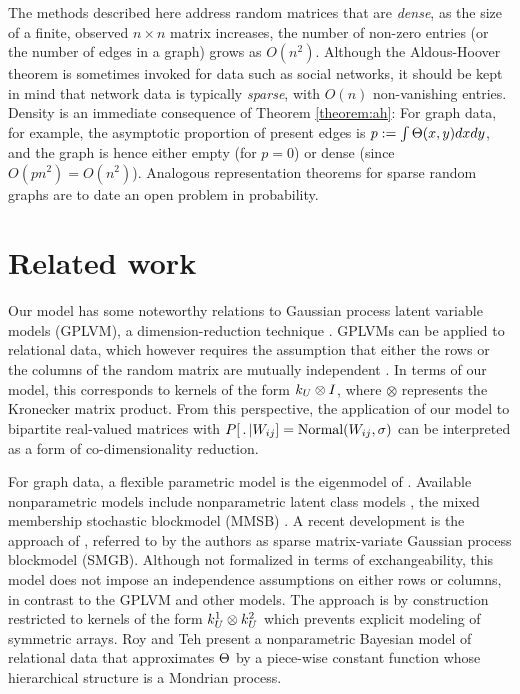 \begin{rem}
  The methods described here address random matrices that are \emph{dense}, \ie as the size of a finite, observed $n\times n$ matrix increases,
  the number of non-zero entries (or the number of edges in a graph) grows as $O(n^2)$. Although the Aldous-Hoover theorem is sometimes invoked
  for data such as social networks, it should be kept in mind that network data is typically \emph{sparse}, with $O(n)$ non-vanishing entries.
  Density is an immediate consequence of Theorem \ref{theorem:ah}: For graph data, for example, the asymptotic proportion of present edges is
  ${p:=\int\Theta(x,y)dxdy}$, and the graph is hence either empty (for $p=0$) or dense (since
  $O(pn^2)=O(n^2)$). Analogous representation theorems for sparse random graphs are to date an open problem in probability.
\end{rem}



\section{Related work}
\label{sec:Related}

Our model has some noteworthy relations to Gaussian process latent variable models (GPLVM), a dimension-reduction technique
\citep[e.g.][]{Lawrence2009}.  GPLVMs can be applied to relational data, which however requires
the assumption that either the rows or the columns of the random matrix are mutually independent \cite{Lawrence2009}. 
In terms of our model, this
corresponds to kernels of the form $k_U \otimes I$, where $\otimes$ represents the Kronecker matrix product. From this perspective, the application of our model
to bipartite real-valued matrices with $P[\,.\,|W_{ij}]=\mbox{Normal}(W_{ij},\sigma)$ can be interpreted as 
a form of co-dimensionality reduction.

For graph data, a flexible parametric model is the eigenmodel of \citet{Hoff2007a}. Available nonparametric models include
nonparametric latent class models \cite{Kemp2006}, the mixed membership stochastic blockmodel (MMSB) \citep{Airoldi2008}.
A recent development is the approach of \citet{Yan:Xu:Qi:2011:1}, referred to by the authors as
sparse matrix-variate Gaussian process blockmodel (SMGB). Although not formalized in terms of exchangeability,
this model does not impose an independence assumptions on either rows or columns, in contrast to the GPLVM and other models.
The approach is by construction restricted to kernels of the form $k_U^1 \otimes k_U^2$ which prevents 
explicit modeling of symmetric arrays.
Roy and Teh \citep{Roy2009} present a nonparametric Bayesian model of relational data that approximates 
$\Theta$ by a piece-wise constant function whose hierarchical structure is a Mondrian process.

